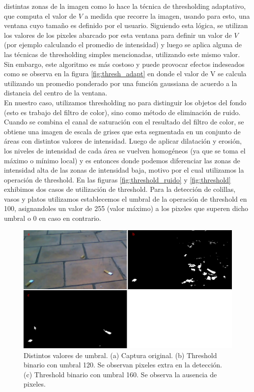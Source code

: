 distintas zonas de la imagen como lo hace la 
técnica de thresholding adaptativo, que computa el valor de $V$ a 
medida que recorre la imagen, usando para esto, una ventana cuyo 
tamaño es definido por el usuario. Siguiendo esta lógica, se utilizan 
los valores de los pixeles abarcado por esta ventana para definir un valor 
de $V$ (por ejemplo calculando el promedio de intensidad) y luego se 
aplica alguna de las técnicas de thresholding simples mencionadas, 
utilizando este mismo valor. Sin embargo, este algoritmo es más 
costoso y puede provocar efectos indeseados como se observa en la 
figura \ref{fig:thresh_adapt} en donde el valor de V se calcula 
utilizando un promedio ponderado por una función gaussiana de acuerdo a la distancia del centro 
de la ventana.\\
\indent En nuestro caso, utilizamos thresholding no para distinguir los 
objetos del fondo (esto es trabajo del filtro de color), sino como 
método de eliminación de ruido. Cuando se combina el canal de 
saturación con el resultado del filtro de color, se obtiene una imagen 
de escala de grises que esta segmentada en un conjunto de áreas con 
distintos valores de intensidad. Luego de aplicar dilatación y 
erosión, los niveles de intensidad de cada área se vuelven 
homogéneos (ya que se toma el máximo o mínimo local) y es entonces 
donde podemos diferenciar las zonas de intensidad alta de las zonas de 
intensidad baja, motivo por el cual utilizamos la operación de 
threshold. En las figuras \ref{fig:threshold_ruido} y 
\ref{fig:threshold} exhibimos dos casos de utilización de threshold. 
Para la detección de colillas, vasos y platos utilizamos establecemos 
el umbral de la operación de threshold en 100, asignandoles un valor 
de 255 (valor máximo) a los pixeles que superen dicho umbral o 0 en 
caso en contrario. 
\begin{figure}[tpb]
\begin{center}
  \includegraphics[scale=0.4]{figuras/threshold-dif.png}
\end{center}
  \caption{\small Distintos valores de umbral. (a) Captura original. 
  (b) Threshold binario con umbral 120. Se observan pixeles extra en 
  la detección. (c) Threshold binario con umbral 160. Se observa la 
  ausencia de pixeles. }
  \label{fig:thresh-dif}
\end{figure}

